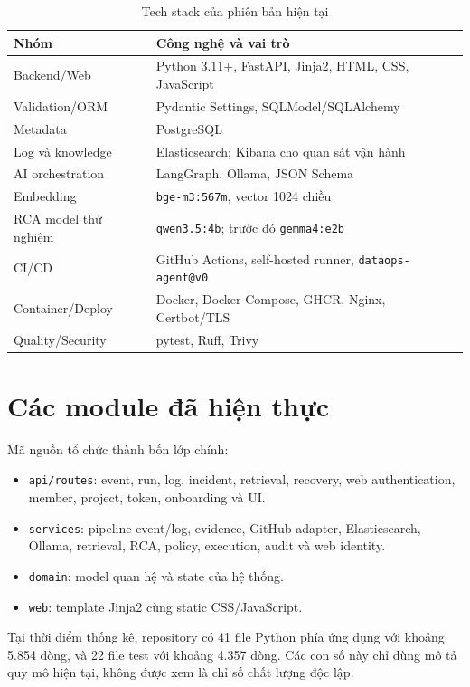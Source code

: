 \documentclass[12pt,a4paper,oneside]{report}
\newcommand{\code}[1]{\texttt{#1}}
\begin{document}
\begin{table}[H]
\centering
\caption{Tech stack của phiên bản hiện tại}
\label{tab:tech-stack}
\begin{tabularx}{\textwidth}{L{3.7cm} Y}
\toprule
\textbf{Nhóm} & \textbf{Công nghệ và vai trò} \\
\midrule
Backend/Web & Python 3.11+, FastAPI, Jinja2, HTML, CSS, JavaScript \\
Validation/ORM & Pydantic Settings, SQLModel/SQLAlchemy \\
Metadata & PostgreSQL \\
Log và knowledge & Elasticsearch; Kibana cho quan sát vận hành \\
AI orchestration & LangGraph, Ollama, JSON Schema \\
Embedding & \code{bge-m3:567m}, vector 1024 chiều \\
RCA model thử nghiệm & \code{qwen3.5:4b}; trước đó \code{gemma4:e2b} \\
CI/CD & GitHub Actions, self-hosted runner, \code{dataops-agent@v0} \\
Container/Deploy & Docker, Docker Compose, GHCR, Nginx, Certbot/TLS \\
Quality/Security & pytest, Ruff, Trivy \\
\bottomrule
\end{tabularx}
\end{table}

\section{Các module đã hiện thực}

Mã nguồn tổ chức thành bốn lớp chính:

\begin{itemize}
  \item \code{api/routes}: event, run, log, incident, retrieval, recovery, web authentication,
  member, project, token, onboarding và UI.
  \item \code{services}: pipeline event/log, evidence, GitHub adapter, Elasticsearch, Ollama,
  retrieval, RCA, policy, execution, audit và web identity.
  \item \code{domain}: model quan hệ và state của hệ thống.
  \item \code{web}: template Jinja2 cùng static CSS/JavaScript.
\end{itemize}

Tại thời điểm thống kê, repository có 41 file Python phía ứng dụng với khoảng 5.854 dòng, và
22 file test với khoảng 4.357 dòng. Các con số này chỉ dùng mô tả quy mô hiện tại, không được xem
là chỉ số chất lượng độc lập.
\end{document}
